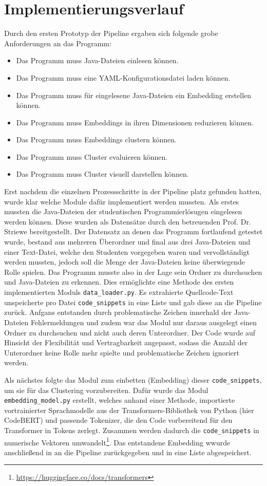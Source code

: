 \section{Implementierungsverlauf}
Durch den ersten Prototyp der Pipeline ergaben sich folgende grobe Anforderungen an das Programm:
\begin{itemize}
    \item Das Programm muss Java-Dateien einlesen können.
    \item Das Programm muss eine YAML-Konfigurationsdatei laden können.
    \item Das Programm muss für eingelesene Java-Dateien ein Embedding erstellen können.
    \item Das Programm muss Embeddings in ihren Dimensionen reduzieren können.
    \item Das Programm muss Embeddings clustern können.
    \item Das Programm muss Cluster evaluieren können.
    \item Das Programm muss Cluster visuell darstellen können.
\end{itemize}
Erst nachdem die einzelnen Prozessschritte in der Pipeline platz gefunden hatten, wurde klar welche Module dafür implementiert werden mussten. Als erstes mussten die Java-Dateien der studentischen Programmierlösugen eingelesen werden können. Diese wurden als Datensätze durch den betreuenden Prof. Dr. Striewe bereitgestellt. Der Datensatz an denen das Programm fortlaufend getestet wurde, bestand aus mehreren Überordner und final aus drei Java-Dateien und einer Text-Datei, welche den Studenten vorgegeben waren und vervollständigt werden mussten, jedoch soll die Menge der Java-Dateien keine überwiegende Rolle spielen. Das Programm musste also in der Lage sein Ordner zu durchsuchen und Java-Dateien zu erkennen. Dies ermöglichte eine Methode des ersten implementierten Moduls \texttt{data\_loader.py}. Es extrahierte Quellcode-Text unspeicherte pro Datei \texttt{code\_snippets} in eine Liste und gab diese an die Pipeline zurück. Anfgans entstanden durch problematische Zeichen innerhald der Java-Dateien Fehlermeldungen und zudem war das Modul nur daraus ausgelegt einen Ordner zu durchsuchen und nicht auch deren Unterordner. Der Code wurde auf Hinsicht der Flexibilität und Vertragbarkeit angepasst, sodass die Anzahl der Unterordner keine Rolle mehr spielte und problematische Zeichen ignoriert werden.

Als nächstes folgte das Modul zum einbetten (Embedding) dieser \texttt{code\_snippets}, um sie für das Clustering vorzubereiten. Dafür wurde das Modul \texttt{embedding\_model.py} erstellt, welches anhand einer Methode, importierte vortrainierter Sprachmodelle aus der Transformers-Bibliothek von Python (hier CodeBERT) und passende Tokenizer, die den Code vorbereitend für den Transformer in Tokens zerlegt. Zusammen werden dadurch die \texttt{code\_snippets} in numerische Vektoren umwandelt\footnote{\url{https://huggingface.co/docs/transformers}}. Das entstandene Embedding wwurde anschließend in an die Pipeline zurückgegeben und in eine Liste abgespeichert.

